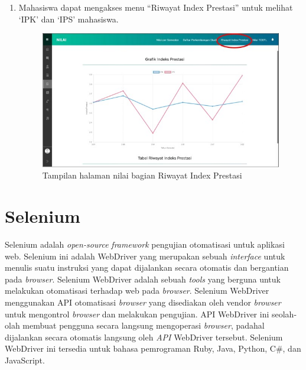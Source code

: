 \begin{enumerate}
\begin{enumerate}
\begin{figure}[H]
			\label{fig:nilai_2018}
		\end{figure}
		\item Mahasiswa dapat mengakses menu ``Riwayat Index Prestasi'' untuk melihat `IPK' dan `IPS' mahasiswa.
		\begin{figure}[H]
			\centering
			\includegraphics[scale=0.7]{Gambar/rip2018.jpg}
			\caption{Tampilan halaman nilai bagian Riwayat Index Prestasi} 
			\label{fig:rip_2018}
		\end{figure}
	\end{enumerate}	
\end{enumerate}

\section{Selenium}
\label{sec:selenium}
Selenium adalah \textit{open-source} \textit{framework} pengujian otomatisasi untuk aplikasi web\cite{selenium}. Selenium ini adalah WebDriver yang merupakan sebuah \textit{interface} untuk menulis suatu instruksi yang dapat dijalankan secara otomatis dan bergantian pada \textit{browser}.  Selenium WebDriver adalah sebuah \textit{tools} yang berguna untuk melakukan otomatisasi terhadap web pada \textit{browser}. Selenium WebDriver menggunakan API otomatisasi \textit{browser} yang disediakan oleh vendor \textit{browser} untuk mengontrol \textit{browser} dan melakukan pengujian. API WebDriver ini seolah-olah membuat pengguna secara langsung mengoperasi \textit{browser}, padahal dijalankan secara otomatis langsung oleh \textit{API} WebDriver tersebut. Selenium WebDriver ini tersedia untuk bahasa pemrograman Ruby, Java, Python, C\#, dan JavaScript. 

